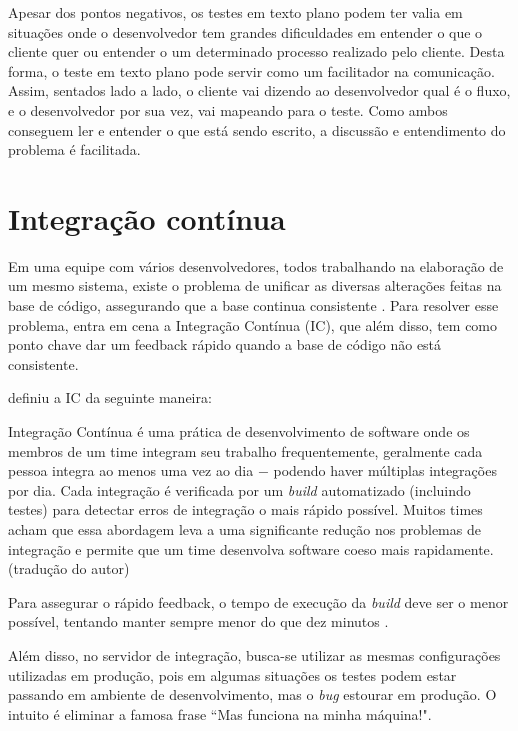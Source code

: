 Apesar dos pontos negativos, os testes em texto plano podem ter valia em situações onde o desenvolvedor tem grandes dificuldades em entender o que o cliente quer ou entender o um determinado processo realizado pelo cliente. Desta forma, o teste em texto plano pode servir como um facilitador na comunicação. Assim, sentados lado a lado, o cliente vai dizendo ao desenvolvedor qual é o fluxo, e o desenvolvedor por sua vez, vai mapeando para o teste. Como ambos conseguem ler e entender o que está sendo escrito, a discussão e entendimento do problema é facilitada.




\section{Integração contínua} %
\label{sec:integracao_continua}

Em uma equipe com vários desenvolvedores, todos trabalhando na elaboração de um mesmo sistema, existe o problema de unificar as diversas alterações feitas na base de código, assegurando que a base continua consistente \cite{ImproveitCI}. Para resolver esse problema, entra em cena a Integração Contínua (IC), que além disso, tem como ponto chave dar um feedback rápido quando a base de código não está consistente.

\cite{FowlerCI} definiu a IC da seguinte maneira:

\begin{citacao}
Integração Contínua é uma prática de desenvolvimento de software onde os membros de um time integram seu trabalho frequentemente, geralmente cada pessoa integra ao menos uma vez ao dia $-$ podendo haver múltiplas integrações por dia. Cada integração é verificada por um \textit{build} automatizado (incluindo testes) para detectar erros de integração o mais rápido possível. Muitos times acham que essa abordagem leva a uma significante redução nos problemas de integração e permite que um time desenvolva software coeso mais rapidamente. (tradução do autor)
\end{citacao}

Para assegurar o rápido feedback, o tempo de execução da \textit{build} deve ser o menor possível, tentando manter sempre menor do que dez minutos \cite{FowlerCI}.

Além disso, no servidor de integração, busca-se utilizar as mesmas configurações utilizadas em produção, pois em algumas situações os testes podem estar passando em ambiente de desenvolvimento, mas o \textit{bug} estourar em produção. O intuito é eliminar a famosa frase ``Mas funciona na minha máquina!".

